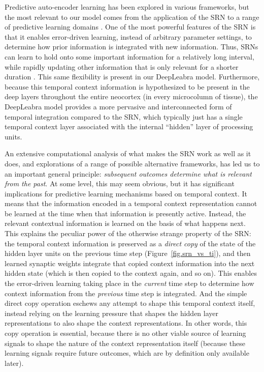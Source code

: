 \documentclass[11pt,twoside]{article}
\newif\myifpdf
\begin{document}
Predictive auto-encoder learning has been explored in various frameworks, but the most relevant to our model comes from the application of the SRN to a range of predictive learning domains \cite{Elman90,Elman91,Jordan89,ElmanBatesKarmiloff-SmithEtAl96}.  One of the most powerful features of the SRN is that it enables error-driven learning, instead of arbitrary parameter settings, to determine how prior information is integrated with new information.  Thus, SRNs can learn to hold onto some important information for a relatively long interval, while rapidly updating other information that is only relevant for a shorter duration \cite[e.g.,]{CleeremansServan-SchreiberMcClelland89,Cleeremans93}.  This same flexibility is present in our DeepLeabra model.  Furthermore, because this temporal context information is hypothesized to be present in the deep layers throughout the entire neocortex (in every microcolumn of tissue), the DeepLeabra model provides a more pervasive and interconnected form of temporal integration compared to the SRN, which typically just has a single temporal context layer associated with the internal ``hidden'' layer of processing units.

An extensive computational analysis of what makes the SRN work as well as it does, and explorations of a range of possible alternative frameworks, has led us to an important general principle: {\em subsequent outcomes determine what is relevant from the past}.  At some level, this may seem obvious, but it has significant implications for predictive learning mechanisms based on temporal context.  It means that the information encoded in a temporal context representation cannot be learned at the time when that information is presently active.  Instead, the relevant contextual information is learned on the basis of what happens next.  This explains the peculiar power of the otherwise strange property of the SRN: the temporal context information is preserved as a {\em direct copy} of the state of the hidden layer units on the previous time step (Figure~\ref{fig.srn_vs_ti}), and then learned synaptic weights integrate that copied context information into the next hidden state (which is then copied to the context again, and so on).  This enables the error-driven learning taking place in the {\em current} time step to determine how context information from the {\em previous} time step is integrated.  And the simple direct copy operation eschews any attempt to shape this temporal context itself, instead relying on the learning pressure that shapes the hidden layer representations to also shape the context representations.  In other words, this copy operation is essential, because there is no other viable source of learning signals to shape the nature of the context representation itself (because these learning signals require future outcomes, which are by definition only available later).
\end{document}
